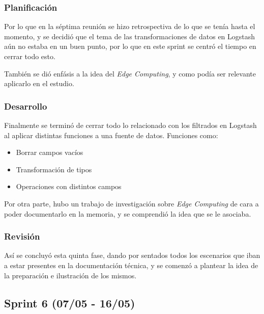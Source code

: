 \subsubsection{Planificación}
Por lo que en la séptima reunión se hizo retrospectiva de lo que se tenía hasta el momento, y se decidió que el tema de las transformaciones de datos en Logstash aún no estaba en un buen punto, por lo que en este sprint se centró el tiempo en cerrar todo esto.

También se dió enfásis a la idea del \textit{Edge Computing}, y como podía ser relevante aplicarlo en el estudio.

\subsubsection{Desarrollo}
Finalmente se terminó de cerrar todo lo relacionado con los filtrados en Logstash al aplicar distintas funciones a una fuente de datos. Funciones como:
\begin{itemize}
    \item Borrar campos vacíos
    \item Transformación de tipos
    \item Operaciones con distintos campos
\end{itemize}

Por otra parte, hubo un trabajo de investigación sobre \textit{Edge Computing} de cara a poder documentarlo en la memoria, y se comprendió la idea que se le asociaba.

\subsubsection{Revisión}
Así se concluyó esta quinta fase, dando por sentados todos los escenarios que iban a estar presentes en la documentación técnica, y se comenzó a plantear la idea de la preparación e ilustración de los mismos.

\paragraph{}
\paragraph{}
\paragraph{}


\subsection{Sprint 6 (07/05 - 16/05)}
